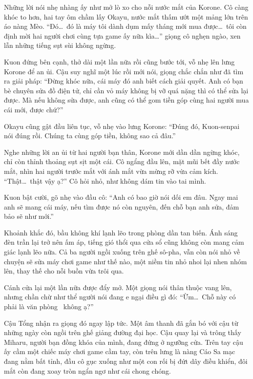 \documentclass[../main.tex]{subfiles}
\begin{document}
Những lời nói nhẹ nhàng ấy như mở lò xo cho nỗi nước mắt của Korone. Cô càng khóc to hơn, hai tay ôm chầm lấy Okayu, nước mắt thấm ướt một mảng lớn trên áo nàng Mèo. ``Đó\dots\ đó là máy tôi dành dụm mấy tháng mới mua được\dots\ tôi còn định mời hai người chơi cùng tựa game ấy nữa kìa\dots'' giọng cô nghẹn ngào, xen lẫn những tiếng sụt sùi không ngừng.

Kuon đứng bên cạnh, thở dài một lần nữa rồi cũng bước tới, vỗ nhẹ lên lưng Korone để an ủi. Cậu suy nghĩ một lúc rồi mới nói, giọng chắc chắn như đã tìm ra giải pháp: ``Đừng khóc nữa, cái máy đó anh biết cách giải quyết. Anh có bạn bè chuyên sửa đồ điện tử, chỉ cần vỏ máy không bị vỡ quá nặng thì có thể sửa lại được. Mà nếu không sửa được, anh cũng có thể gom tiền góp cùng hai người mua cái mới, được chứ?''

Okayu cũng gật đầu liên tục, vỗ nhẹ vào lưng Korone: ``Đúng đó, Kuon-senpai nói đúng rồi. Chúng ta cùng góp tiền, không sao cả đâu.''

Nghe những lời an ủi từ hai người bạn thân, Korone mới dần dần ngừng khóc, chỉ còn thỉnh thoảng sụt sịt một cái. Cô ngẩng đầu lên, mặt mũi bết đầy nước mắt, nhìn hai người trước mắt với ánh mắt vừa mừng rỡ vừa cảm kích. ``Thật\dots\ thật vậy ạ?'' Cô hỏi nhỏ, như không dám tin vào tai mình.

Kuon bật cười, gõ nhẹ vào đầu cô: ``Anh có bao giờ nói dối em đâu. Ngay mai anh sẽ mang cái máy, nếu tìm được nó còn nguyên, đến chỗ bạn anh sửa, đảm bảo sẽ như mới.''

Khoảnh khắc đó, bầu không khí lạnh lẽo trong phòng dần tan biến. Ánh sáng đèn trần lại trở nên ấm áp, tiếng gió thổi qua cửa sổ cũng không còn mang cảm giác lạnh lẽo nữa. Cả ba người ngồi xuống trên ghế sô-pha, vẫn còn nói nhỏ về chuyện sẽ sửa máy chơi game như thế nào, một niềm tin nhỏ nhoi lại nhen nhóm lên, thay thế cho nỗi buồn vừa trôi qua.

\ct

Cánh cửa lại một lần nữa được đẩy mở. Một giọng nói thân thuộc vang lên, nhưng chần chừ như thể người nói đang e ngại điều gì đó: ``Ừm\dots\ Chỗ này có phải là văn phòng \hll\ không ạ?''

Cậu Tổng nhận ra giọng đó ngay lập tức. Một âm thanh đã gắn bó với cậu từ những ngày còn ngồi trên ghế giảng đường đại học. Cậu quay lại và trông thấy Miharu, người bạn đồng khóa của mình, đang đứng ở ngưỡng cửa. Trên tay cậu ấy cầm một chiếc máy chơi game cầm tay, còn trên lưng là nàng Cáo Sa mạc đang nằm bất tỉnh, đầu cô gục xuống như một con rối bị đứt dây điều khiển, đôi mắt còn đang xoay tròn ngẩn ngơ như cái chong chóng.
\end{document}
